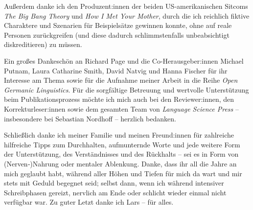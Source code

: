 Außerdem danke ich den Produzent:innen der beiden US-amerikanischen Sitcoms \textit{The Big Bang Theory} und \textit{How I Met Your Mother}, durch die ich reichlich fiktive Charaktere und Szenarien für Beispielsätze gewinnen konnte, ohne auf reale Personen zurückgreifen (und diese dadurch schlimmstenfalls unbeabsichtigt diskreditieren) zu müssen.


Ein großes Dankeschön an Richard Page und die Co-Herausgeber:innen Michael Putnam, Laura Catharine Smith, David Natvig und Hanna Fischer für ihr Interesse am Thema sowie für die Aufnahme meiner Arbeit in die Reihe \textit{Open Germanic Linguistics}. Für die sorgfältige Betreuung und wertvolle Unterstützung beim Publikationsprozess möchte ich mich auch bei den Reviewer:innen, den Korrekturleser:innen sowie dem gesamten Team von \textit{Language Science Press} -- insbesondere bei Sebastian Nordhoff -- herzlich bedanken.


Schließlich danke ich meiner Familie und meinen Freund:innen für zahlreiche hilfreiche Tipps zum Durchhalten, aufmunternde Worte und jede weitere Form der Unterstützung, des Verständnisses und des Rückhalts -- sei es in Form von (Nerven‑)Nahrung oder mentaler Ablenkung. Danke, dass ihr all die Jahre an mich geglaubt habt, während aller Höhen und Tiefen für mich da wart und mir stets mit Geduld begegnet seid; selbst dann, wenn ich während intensiver Schreibphasen gereizt, nervlich am Ende oder schlicht wieder einmal nicht verfügbar war. Zu guter Letzt danke ich Lars -- für alles.


